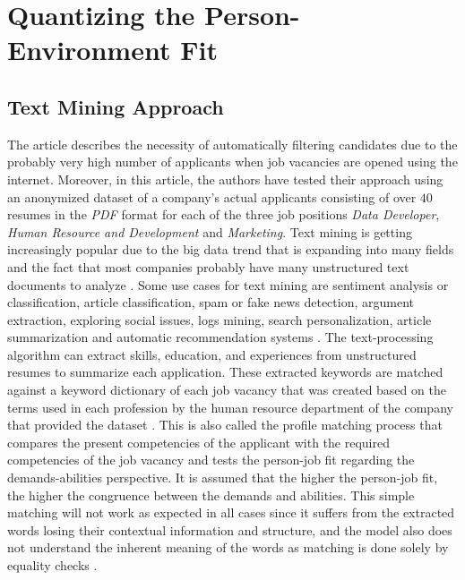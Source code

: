 \documentclass[draft,final]{thesisclass} %
\begin{document}
\section{Quantizing the Person-Environment Fit}

\subsection{Text Mining Approach} \label{text_mining_approach}
The article \textcite{text_mining_for_automatic_profiling} describes the necessity of automatically filtering candidates due to the probably very high number of applicants when job vacancies are opened using the internet.
Moreover, in this article, the authors have tested their approach using an anonymized dataset of a company's actual applicants consisting of over $40$ resumes in the \textit{PDF} format for each of the three job positions \textit{Data Developer}, \textit{Human Resource and Development} and \textit{Marketing}.
Text mining is getting increasingly popular due to the big data trend that is expanding into many fields and the fact that most companies probably have many unstructured text documents to analyze \parencite[49]{text_mining_for_automatic_profiling}.
Some use cases for text mining are sentiment analysis or classification, article classification, spam or fake news detection, argument extraction, exploring social issues, logs mining, search personalization, article summarization and automatic recommendation systems \parencite[49]{text_mining_for_automatic_profiling}.
The text-processing algorithm can extract skills, education, and experiences from unstructured resumes to summarize each application.
These extracted keywords are matched against a keyword dictionary of each job vacancy that was created based on the terms used in each profession by the human resource department of the company that provided the dataset \parencite[47]{text_mining_for_automatic_profiling}.
This is also called the profile matching process that compares the present competencies of the applicant with the required competencies of the job vacancy and tests the person-job fit regarding the demands-abilities perspective.
It is assumed that the higher the person-job fit, the higher the congruence between the demands and abilities.
This simple matching will not work as expected in all cases since it suffers from the extracted words losing their contextual information and structure, and the model also does not understand the inherent meaning of the words as matching is done solely by equality checks \parencite[517]{applicant_semantic_matching}.
\end{document}
